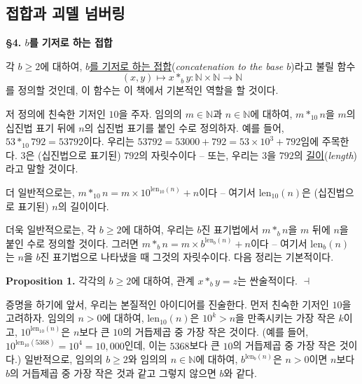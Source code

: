 \documentclass[12pt]{paper}
\newenvironment{context}[1][]{\noindent \textbf{{#1}.}}{\hfill $ \dashv $}
\begin{document}
  \subsection{접합과 괴델 넘버링}
  \hspace{12pt}

  \noindent \textbf{\S 4. $b$를 기저로 하는 접합}

  각 $b \geq 2$에 대하여, \underline{$b$를 기저로 하는 접합}(\textit{concatenation to the base $b$})라고 불릴 함수 $$\left( x , y \right) \mapsto x *_{b} y : \mathbb{N} \times \mathbb{N} \to \mathbb{N}$$를 정의할 것인데,
  이 함수는 이 책에서 기본적인 역할을 할 것이다.

  저 정의에 친숙한 기저인 $10$을 주자.
  임의의 $m \in \mathbb{N}$과 $n \in \mathbb{N}$에 대하여,
  $m *_{10} n$을 $m$의 십진법 표기 뒤에 $n$의 십진법 표기를 붙인 수로 정의하자.
  예를 들어, $53 *_{10} 792 = 53792$이다.
  우리는 $53792 = 53000 + 792 = 53 \times 10^{3} + 792$임에 주목한다.
  $3$은 (십진법으로 표기된) $792$의 자릿수이다 --
  또는, 우리는 $3$을 $792$의 \underline{길이}(\textit{length})라고 말할 것이다.

  더 일반적으로는, $m *_{10} n = m \times 10^{\mathrm{len}_{10} \left( n \right)} + n$이다 --
  여기서 $\mathrm{len}_{10} \left( n \right)$은 (십진법으로 표기된) $n$의 길이이다.

  더욱 일반적으로는, 각 $b \geq 2$에 대하여,
  우리는 $b$진 표기법에서 $m *_{b} n$을 $m$ 뒤에 $n$을 붙인 수로 정의할 것이다.
  그러면 $m *_{b} n = m \times b^{\mathrm{len}_{b} \left( n \right)} + n$이다 --
  여기서 $\mathrm{len}_{b} \left( n \right)$는 $n$을 $b$진 표기법으로 나타냈을 때 그것의 자릿수이다.
  다음 정리는 기본적이다.

  \begin{context}[Proposition 1]
    각각의 $b \geq 2$에 대하여, 관계 $x *_{b} y = z$는 싼술적이다.
  \end{context}
  
  증명을 하기에 앞서, 우리는 본질적인 아이디어를 진술한다.
  먼저 친숙한 기저인 $10$을 고려하자.
  임의의 $n > 0$에 대하여, $\mathrm{len}_{10} \left( n \right)$은 $10^{k} > n$을 만족시키는 가장 작은 $k$이고,
  $10^{\mathrm{len}_{10} \left( n \right)}$은 $n$보다 큰 $10$의 거듭제곱 중 가장 작은 것이다.
  (예를 들어, $10^{\mathrm{len}_{10} \left( 5368 \right)} = 10^4 = 10,000$인데, 이는 $5368$보다 큰 $10$의 거듭제곱 중 가장 작은 것이다.)
  일반적으로, 임의의 $b \geq 2$와 임의의 $n \in \mathbb{N}$에 대하여,
  $b^{\mathrm{len}_{b} \left( n \right)}$은 $n > 0$이면 $n$보다 $b$의 거듭제곱 중 가장 작은 것과 같고 그렇지 않으면 $b$와 같다.
\end{document}
